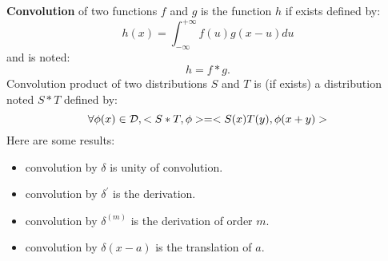 \documentclass[12pt]{book}
\begin{document}
{\bf Convolution} of two functions $f$ and $g$ is the function $h$ if
exists defined by:
\begin{equation}
h(x)=\int_{-\infty}^{+\infty}f(u)g(x-u)du
\end{equation}
and is noted:
\begin{equation}
h=f * g.
\end{equation}
Convolution product of two distributions $S$ and $T$ is (if exists) a
distribution noted $S*T$ defined by:
\begin{equation}
\forall \phi(x) \in {\cal D}, <S*T,\phi>=<S(x)T(y),\phi(x+y)>
\end{equation}
Here are some results:
\begin{itemize}
\item convolution by $\delta$ is unity of convolution.
\item convolution by $\delta^{\prime}$ is the derivation.
\item convolution by $\delta^{(m)}$ is the derivation of order $m$.
\item convolution by $\delta(x-a)$ is the translation of $a$.
\end{itemize}
\end{document}
